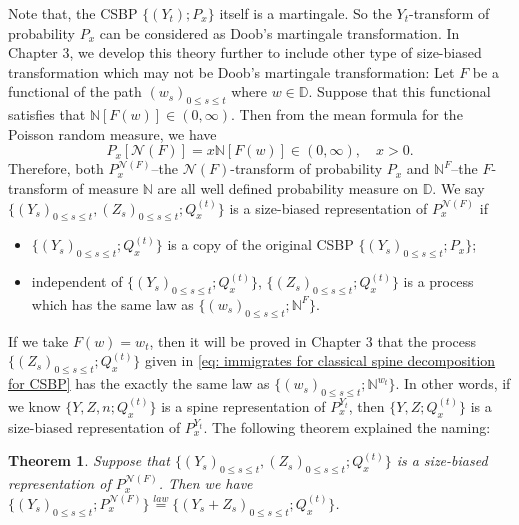 \documentclass[UTF8]{pkuthss}
\theoremstyle{plain}
\newtheorem{thm}{Theorem}[section]
\theoremstyle{definition}
\numberwithin{equation}{section}
\begin{document}
	Note that, the CSBP $\{(Y_t); P_x\}$ itself is a martingale. So the $Y_t$-transform of probability $P_x$ can be considered as Doob's martingale transformation.
	In Chapter 3, we develop this theory further to include other type of size-biased transformation which may not be Doob's martingale transformation: Let $F$ be a functional of the path $(w_s)_{0\leq s\leq t}$ where $w \in \mathbb D$. Suppose that this functional satisfies that $\mathbb N[F(w)] \in (0,\infty)$. Then from the mean formula for the Poisson random measure, we have
\[
	P_x[\mathcal N(F)]= x\mathbb N[F(w)]\in (0,\infty),\quad x>0.	
\]
	Therefore, both $P_x^{\mathcal N(F)}$--the $\mathcal N(F)$-transform of probability $P_x$ and $\mathbb N^{F}$--the $F$-transform of measure $\mathbb N$ are all well defined probability measure on $\mathbb D$.
	We say $\{(Y_s)_{0\leq s\leq t}, (Z_s)_{0\leq s\leq t}; Q_x^{(t)}\}$ is a size-biased representation of $P_x^{\mathcal N(F)}$ if
\begin{itemize}
\item
	$\{(Y_s)_{0\leq s\leq t}; Q_x^{(t)}\}$ is a copy of the original CSBP $\{(Y_s)_{0\leq s\leq t}; P_x\}$;
\item
	independent of $\{(Y_s)_{0\leq s\leq t}; Q_x^{(t)}\}$, $\{(Z_s)_{0\leq s\leq t}; Q_x^{(t)}\}$ is a process which has the same law as $\{(w_s)_{0\leq s\leq t}; \mathbb N^F\}$.
\end{itemize}
	If we take $F(w)= w_t$, then it will be proved in Chapter 3 that the process $\{(Z_s)_{0\leq s\leq t}; Q_x^{(t)}\}$ given in \eqref{eq: immigrates for classical spine decomposition for CSBP} has the exactly the same law as $\{(w_s)_{0\leq s\leq t}; \mathbb N^{w_t}\}$. 
	In other words, if we know $\{Y, Z, n; Q_x^{(t)}\}$ is a spine representation of $P_x^{Y_t}$, then $\{Y, Z; Q_x^{(t)}\}$ is a size-biased representation of $P_x^{Y_t}$. The following theorem explained the naming: 

\begin{thm}
	Suppose that $\{(Y_s)_{0\leq s\leq t}, (Z_s)_{0\leq s\leq t}; Q_x^{(t)}\}$ is a size-biased representation of $P_x^{\mathcal N(F)}$. Then we have $\{(Y_s)_{0\leq s\leq t}; P^{\mathcal N(F)}_x\} \overset{law}{=} \{(Y_s+Z_s)_{0\leq s\leq t}; Q_x^{(t)}\}$.
\end{thm}
	
\end{document}
